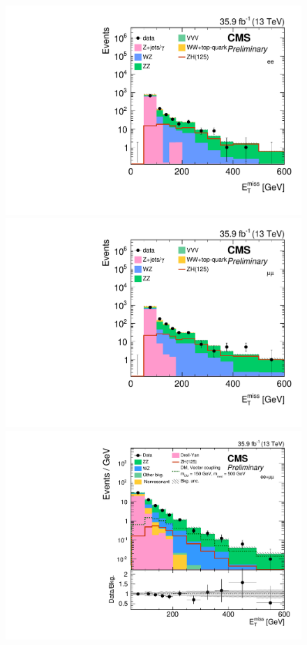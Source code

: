 \begin{figure}[hbtp]
\begin{center}
\includegraphics[height=0.3\textheight,width=\cmsFigWidth]{figures/fullsel_met_ee.pdf}
\includegraphics[height=0.3\textheight,width=\cmsFigWidth]{figures/fullsel_met_mm.pdf} \\
\includegraphics[height=0.3\textheight,width=\cmsFigWidth]{figures/fullsel_met_ll_postfit.pdf}

\end{center}
\end{figure}
